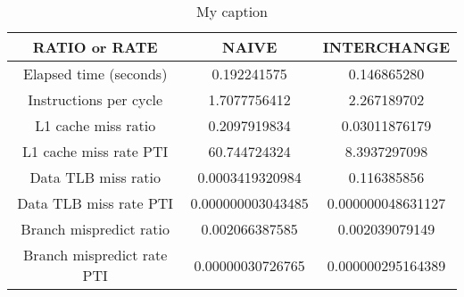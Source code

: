 \begin{table}[]
\centering
\caption{My caption}
\label{my-label}
\begin{tabular}{|c|c|c|}
\hline
\textbf{RATIO or RATE}        & \textbf{NAIVE}    & \textbf{INTERCHANGE} \\ \hline
Elapsed time (seconds)     & 0.192241575       & 0.146865280          \\ \hline
Instructions per cycle     & 1.7077756412      & 2.267189702         \\ \hline
L1 cache miss ratio        & 0.2097919834      & 0.03011876179        \\ \hline
L1 cache miss rate PTI     & 60.744724324      & 8.3937297098         \\ \hline
Data TLB miss ratio        & 0.0003419320984   & 0.116385856          \\ \hline
Data TLB miss rate PTI     & 0.000000003043485 & 0.000000048631127    \\ \hline
Branch mispredict ratio    & 0.002066387585    & 0.002039079149       \\ \hline
Branch mispredict rate PTI & 0.00000030726765  & 0.000000295164389    \\ \hline
\end{tabular}
\end{table}
